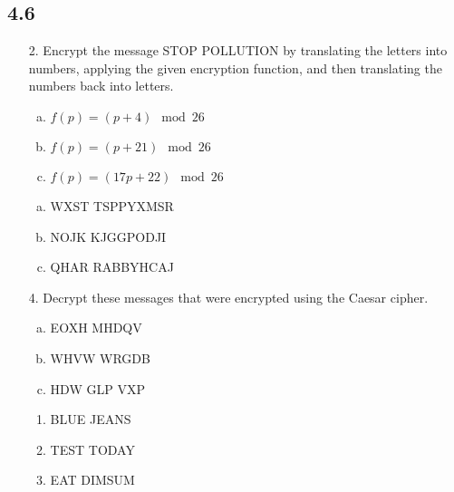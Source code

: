 \subsection{4.6}
\begin{itemize}
    \item[2.] Encrypt the message STOP POLLUTION by translating the letters into numbers, applying the given encryption function, and then translating the numbers back into letters.
          \begin{enumerate}[a.]
              \item $f (p) = (p + 4) \mod 26$
              \item $f (p) = (p + 21) \mod 26$
              \item $f (p) = (17p + 22) \mod 26$
          \end{enumerate}
          \answer
          \begin{enumerate}[a.]
              \item WXST TSPPYXMSR
              \item NOJK KJGGPODJI
              \item QHAR RABBYHCAJ
          \end{enumerate}
    \item[4.] Decrypt these messages that were encrypted using the Caesar cipher.
          \begin{enumerate}[a.]
              \item EOXH MHDQV
              \item WHVW WRGDB
              \item HDW GLP VXP
          \end{enumerate}
          \answer
          \begin{enumerate}
              \item BLUE JEANS
              \item TEST TODAY
              \item EAT DIMSUM
          \end{enumerate}



\end{itemize}